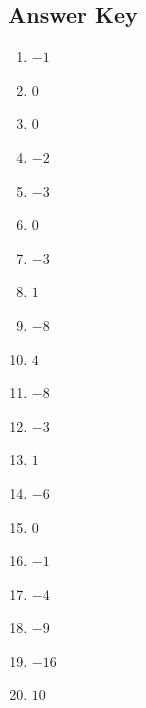 \documentclass{article}
\begin{document}
\newpage

\subsection*{Answer Key}

\begin{enumerate}
\item $\displaystyle -1 $ \ 
\item $\displaystyle 0 $ \ 
\item $\displaystyle 0 $ \ 
\item $\displaystyle -2 $ \ 
\item $\displaystyle -3 $ \ 
\item $\displaystyle 0 $ \ 
\item $\displaystyle -3 $ \ 
\item $\displaystyle 1 $ \ 
\item $\displaystyle -8 $ \ 
\item $\displaystyle 4 $ \ 
\item $\displaystyle -8 $ \ 
\item $\displaystyle -3 $ \ 
\item $\displaystyle 1 $ \ 
\item $\displaystyle -6 $ \ 
\item $\displaystyle 0 $ \ 
\item $\displaystyle -1 $ \ 
\item $\displaystyle -4 $ \ 
\item $\displaystyle -9 $ \ 
\item $\displaystyle -16 $ \ 
\item $\displaystyle 10 $ \ 

\end{enumerate}
\end{document}
